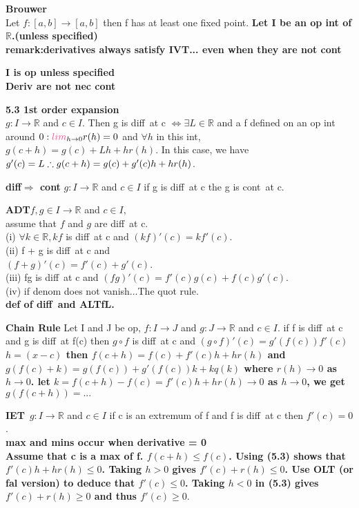\documentclass[10pt,landscape,a4paper]{article}
\def\line{

  \noindent{\color{mygray} \rule{\linewidth}{0.005mm}}

}
\def\R{\mathbb{R}}
\def\lim{\textcolor{frenchrose}{lim}}
\def\diff{\textcolor{brickred}{diff}}
\def\cont{\textcolor{brickred}{cont}}
\newcommand\thm[1]{\line\textcolor{darklavender}{\bf#1}}
\newcommand\hint[1]{\textcolor{trolleygrey}{\bf#1}}
\newcommand\LIMh{\lim_{h\to 0}}
\begin{document}
\begin{multicols}{8}
\thm{Brouwer} \\Let $f:[a,b] \to [a,b]$ then f has at least one fixed point.
\hint{Let I be an op int  of $\R$.(unless specified)\\remark:derivatives always satisfy IVT... even when they are not \cont}

\line
\hint{I is op unless specified
\\Deriv are not nec \cont}
\thm{5.3 1st order expansion}\\
$g:I\to \R$ and $c \in I$. Then g is \diff\ at c $\Leftrightarrow \exists L \in \R$ and a f  defined on an op int around $0: \LIMh r(h) = 0$ and $\forall h$ in this int, $g(c+h) = g(c) + Lh + hr(h).$
In this case, we have $g'(c) = L \\\therefore g(c+h) = g(c) + g'(c)h +hr(h)$. 

\thm{\diff $\Rightarrow$ \cont}
$g: I \to \R$ and $ c \in I$ if g is \diff\ at c the g is \cont\ at c.

\thm{ADT}$f, g \in I\to \R$ and $c \in I$, \\assume that $f$ and $g$ are \diff\ at c.\\ 
(i) $\forall k \in \R, kf$ is \diff\ at c and  $(kf)'(c) = kf'(c).$\\
(ii) f + g is \diff\ at c and \\$(f+g)'(c)  = f'(c) + g'(c)$.\\
(iii) fg is \diff\ at c and $(fg)'(c)  = f'(c)g(c) + f(c)g'(c)$.\\
(iv) if denom does not vanish...The quot rule.
\\\hint{def of \diff\ and ALTfL.}

\thm{Chain Rule} Let I and J be op, $f:I \to J$ and $g:J \to \R$ and $c \in I$. if f is \diff\ at c and g is \diff\ at f(c) then $g \circ f$ is \diff\ at c and $(g \circ f)'(c) =g'(f(c))f'(c)$
\hint{$h = (x-c)$ then $f (c + h) = f (c) + f'(c)h + hr(h)$ and $ g(f (c) + k) = g(f (c)) +
g'(f(c))k + kq(k)$ where $r(h) \to 0$ as $h \to 0$. let $k = f (c + h) − f (c) = f'(c)h + hr(h) \to 0$ as $h\to0$, we get $g(f (c + h)) = ...$ }

\thm{IET}\ $ g:I\to \R$ and $c \in I$ if c is an extremum of f and f is \diff\ at c then $f'(c) = 0$.
\\\hint{max and mins occur when derivative = 0}
\\\hint{Assume that c is a max of f. $f(c + h) \leq f(c)$.
 Using (5.3) shows that $f'(c)h + hr(h) \leq 0$.
Taking $h > 0$ gives $f'(c) + r(h) \leq 0$. Use OLT (or fal version)
to deduce that $f'(c) \leq 0$. Taking $h < 0$ in (5.3) gives $f'(c) + r(h) ≥ 0$ and thus
$f'(c) \geq 0.$}


\end{multicols}
\end{document}
